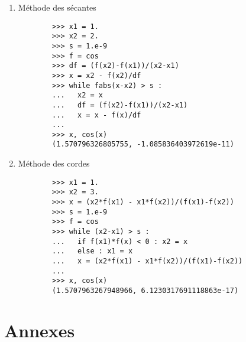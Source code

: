 \begin{description}
\begin{enumerate}
	\item Méthode des sécantes

		\begin{py}{12cm}
		\begin{verbatim}
		>>> x1 = 1.
		>>> x2 = 2.
		>>> s = 1.e-9
		>>> f = cos
		>>> df = (f(x2)-f(x1))/(x2-x1)
		>>> x = x2 - f(x2)/df
		>>> while fabs(x-x2) > s :
		...   x2 = x
		...   df = (f(x2)-f(x1))/(x2-x1)
		...   x = x - f(x)/df
		...
		>>> x, cos(x)
		(1.570796326805755, -1.085836403972619e-11)
		\end{verbatim}
		\end{py}

	\item Méthode des cordes

		\begin{py}{12cm}
		\begin{verbatim}
		>>> x1 = 1.
		>>> x2 = 3.
		>>> x = (x2*f(x1) - x1*f(x2))/(f(x1)-f(x2))
		>>> s = 1.e-9
		>>> f = cos
		>>> while (x2-x1) > s :
		...   if f(x1)*f(x) < 0 : x2 = x
		...   else : x1 = x
		...   x = (x2*f(x1) - x1*f(x2))/(f(x1)-f(x2))
		... 
		>>> x, cos(x)
		(1.5707963267948966, 6.1230317691118863e-17)
		\end{verbatim}
		\end{py}

	\end{enumerate}

\end{description}


\newpage
\setlength{\textwidth}{16cm}
\setlength{\linewidth}{16cm}
\setlength{\textheight}{16cm}
\setlength{\marginparwidth}{8cm}
\setlength{\marginparsep}{1cm}
\setlength{\oddsidemargin}{0cm}
\setlength{\evensidemargin}{+8cm}
\setlength{\topmargin}{-0.75cm}

\section{Annexes}

